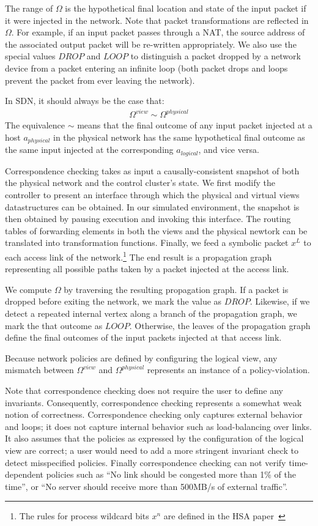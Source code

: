 The range of $\Omega$ is the hypothetical final location and state of the
input packet if it were injected in the network.
Note that packet transformations are reflected in
$\Omega$. For example, if an input packet passes through a NAT,
the source address of the associated output packet will be re-written
appropriately. We also use the special values $DROP$ and $LOOP$ to distinguish
a packet dropped by a network device from a packet entering an
infinite loop (both packet drops and loops prevent the packet from ever leaving the network).

In SDN, it should always be the case that:
\begin{align*}
\Omega^{view} \sim \Omega^{physical}
\end{align*}
The equivalence $\sim$ means that the final outcome of any input packet
injected at a host $a_{physical}$ in the physical network has the same hypothetical final outcome as
the same input injected at the corresponding $a_{logical}$, and vice versa.

Correspondence checking takes as input a causally-consistent
snapshot of both the physical network and the
control cluster's state. We first modify the controller to present an
interface through which the physical and virtual views datastructures can be
obtained. In our simulated environment, the snapshot is
then obtained by pausing execution and invoking this interface.
The routing tables of forwarding elements in both the views and the physical
newtork can be translated into transformation functions.
Finally, we feed a symbolic packet $x^L$ to each access link of the
network.\footnote{The rules for process wildcard bits $x^n$ are defined in
the HSA paper~\cite{hsa}} The end result is a propagation graph representing all possible paths taken by a packet injected
at the access link.

We compute $\Omega$ by traversing the resulting propagation graph. If a packet
is dropped before exiting the network, we mark the value as $DROP$. Likewise,
if we detect a repeated internal vertex along a branch of the propagation graph, we mark the
that outcome as $LOOP$. Otherwise,
the leaves of the propagation graph define the final outcomes of the input
packets injected at that access link.

Because network policies are defined by
configuring the logical view, any mismatch between $\Omega^{view}$ and $\Omega^{physical}$
represents an instance of a policy-violation.

Note that correspondence checking does not require the user
to define any invariants. Consequently, correspondence checking represents a somewhat weak notion of
correctness. Correspondence checking only captures external behavior and
loops; it does not capture internal behavior such as load-balancing
over links. It also assumes that the policies as expressed by the
configuration of the logical view are correct; a user would need to add a more
stringent invariant check to detect misspecified policies.
Finally correspondence checking can not verify
time-dependent policies such as ``No link should be congested more than 1\% of
the time'', or ``No server should receive more than 500MB/s of external traffic''.

